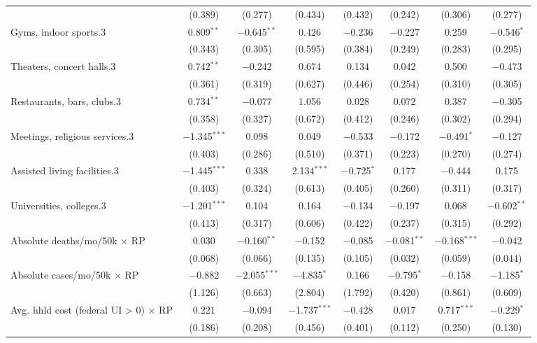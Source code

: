 \begin{table}[!htbp]
\begin{tabular}{@{\extracolsep{5pt}}lccccccc}
  & (0.389) & (0.277) & (0.434) & (0.432) & (0.242) & (0.306) & (0.277) \\ 
  Gyms, indoor sports.3 & 0.809$^{**}$ & $-$0.645$^{**}$ & 0.426 & $-$0.236 & $-$0.227 & 0.259 & $-$0.546$^{*}$ \\ 
  & (0.343) & (0.305) & (0.595) & (0.384) & (0.249) & (0.283) & (0.295) \\ 
  Theaters, concert halls.3 & 0.742$^{**}$ & $-$0.242 & 0.674 & 0.134 & 0.042 & 0.500 & $-$0.473 \\ 
  & (0.361) & (0.319) & (0.627) & (0.446) & (0.254) & (0.310) & (0.305) \\ 
  Restaurants, bars, clubs.3 & 0.734$^{**}$ & $-$0.077 & 1.056 & 0.028 & 0.072 & 0.387 & $-$0.305 \\ 
  & (0.358) & (0.327) & (0.672) & (0.412) & (0.246) & (0.302) & (0.294) \\ 
  Meetings, religious services.3 & $-$1.345$^{***}$ & 0.098 & 0.049 & $-$0.533 & $-$0.172 & $-$0.491$^{*}$ & $-$0.127 \\ 
  & (0.403) & (0.286) & (0.510) & (0.371) & (0.223) & (0.270) & (0.274) \\ 
  Assisted living facilities.3 & $-$1.445$^{***}$ & 0.338 & 2.134$^{***}$ & $-$0.725$^{*}$ & 0.177 & $-$0.444 & 0.175 \\ 
  & (0.403) & (0.324) & (0.613) & (0.405) & (0.260) & (0.311) & (0.317) \\ 
  Universities, colleges.3 & $-$1.201$^{***}$ & 0.104 & 0.164 & $-$0.134 & $-$0.197 & 0.068 & $-$0.602$^{**}$ \\ 
  & (0.413) & (0.317) & (0.606) & (0.422) & (0.237) & (0.315) & (0.292) \\ 
  Absolute deaths/mo/50k $\times$ RP & 0.030 & $-$0.160$^{**}$ & $-$0.152 & $-$0.085 & $-$0.081$^{**}$ & $-$0.168$^{***}$ & $-$0.042 \\ 
  & (0.068) & (0.066) & (0.135) & (0.105) & (0.032) & (0.059) & (0.044) \\ 
  Absolute cases/mo/50k $\times$ RP & $-$0.882 & $-$2.055$^{***}$ & $-$4.835$^{*}$ & 0.166 & $-$0.795$^{*}$ & $-$0.158 & $-$1.185$^{*}$ \\ 
  & (1.126) & (0.663) & (2.804) & (1.792) & (0.420) & (0.861) & (0.609) \\ 
  Avg. hhld cost (federal UI > 0) $\times$ RP & 0.221 & $-$0.094 & $-$1.737$^{***}$ & $-$0.428 & 0.017 & 0.717$^{***}$ & $-$0.229$^{*}$ \\ 
  & (0.186) & (0.208) & (0.456) & (0.401) & (0.112) & (0.250) & (0.130) \\ 

\end{tabular}
\end{table}
